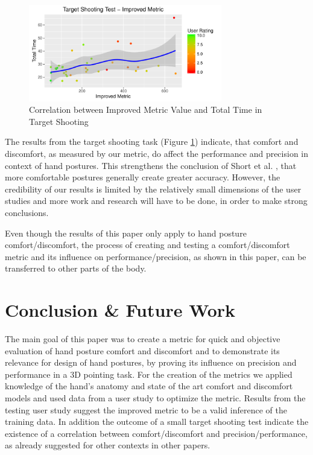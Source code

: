 \documentclass{sig-alternate-05-2015}
\begin{document}
\begin{figure}[h]
\centering
\includegraphics[width=8.45cm]{TargetShooting}
\vspace{-20pt}
\caption{Correlation between Improved Metric Value and Total Time in Target Shooting}
\label{fig:targetShooting}
\vspace{-10pt}
\end{figure}

The results from the target shooting task (Figure \ref{fig:targetShooting}) indicate, that comfort and discomfort, as measured by our metric, do affect the performance and precision in context of hand postures. This strengthens the conclusion of Short et al. \cite{short1999precision}, that more comfortable postures generally create greater accuracy. However, the credibility of our results is limited by the relatively small dimensions of the user studies and more work and research will have to be done, in order to make strong conclusions.

Even though the results of this paper only apply to hand posture comfort/discomfort, the process of creating and testing a comfort/discomfort metric and its influence on performance/precision, as shown in this paper, can be transferred to other parts of the body. 

\section{Conclusion \& Future Work}

The main goal of this paper was to create a metric for quick and objective evaluation of hand posture comfort and discomfort and to demonstrate its relevance for design of hand postures, by proving its influence on precision and performance in a 3D pointing task. For the creation of the metrics we applied knowledge of the hand's anatomy and state of the art comfort and discomfort models and used data from a user study to optimize the metric. Results from the testing user study suggest the improved metric to be a valid inference of the training data. In addition the outcome of a small target shooting test indicate the existence of a correlation between comfort/discomfort and precision/performance, as already suggested for other contexts in other papers.
\end{document}

